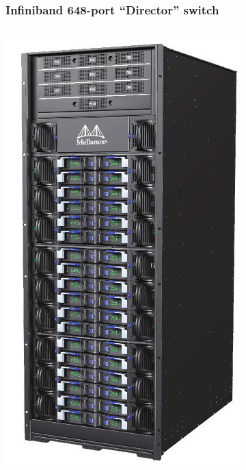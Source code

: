 \documentclass[xcolor={rgb,x11names,svgnames},rgb,x11names,svgnames]{beamer}
\begin{document}
\begin{frame}
  \frametitle{Infiniband 648-port ``Director'' switch }
  \begin{columns}
    \begin{column}{0.3\textwidth}
      \includegraphics[height=0.75\textheight]{infiniband.png}


\end{column}
\end{columns}
\end{frame}
\end{document}
